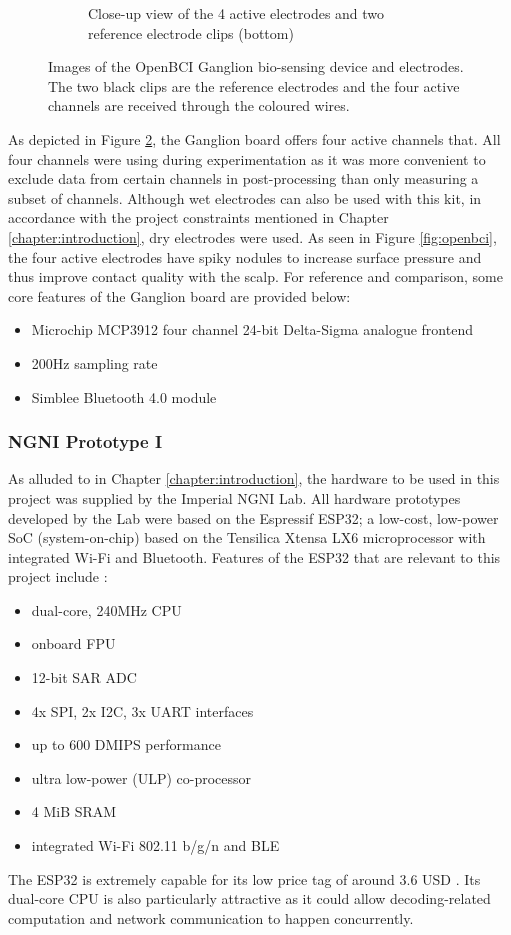 \begin{figure}
\begin{subfigure}[c]{0.45\textwidth}
         \caption{Close-up view of the 4 active electrodes and two reference electrode clips (bottom)}
         \label{fig:openbci-electrodes}
     \end{subfigure}
        \caption[Images of the OpenBCI Ganglion bio-sensing device and electrodes]{Images of the OpenBCI Ganglion bio-sensing device and electrodes. The two black clips are the reference electrodes and the four active channels are received through the coloured wires.}
        \label{fig:openbci-subfigs}
\end{figure}
As depicted in Figure \ref{fig:openbci-subfigs}, the Ganglion board offers four active channels that. All four channels were using during experimentation as it was more convenient to exclude data from certain channels in post-processing than only measuring a subset of channels. Although wet electrodes can also be used with this kit, in accordance with the project constraints mentioned in Chapter \ref{chapter:introduction}, dry electrodes were used. As seen in Figure \ref{fig:openbci}, the four active electrodes have spiky nodules to increase surface pressure and thus improve contact quality with the scalp. For reference and comparison, some core features of the Ganglion board are provided below:
\begin{itemize}
    \item Microchip MCP3912 four channel 24-bit Delta-Sigma analogue frontend
    \item 200Hz sampling rate
    \item Simblee Bluetooth 4.0 module
\end{itemize}

\subsubsection{NGNI Prototype I}

As alluded to in Chapter \ref{chapter:introduction}, the hardware to be used in this project was supplied by the Imperial NGNI Lab. All hardware prototypes developed by the Lab were based on the Espressif ESP32; a low-cost, low-power SoC (system-on-chip) based on the Tensilica Xtensa LX6 microprocessor with integrated Wi-Fi and Bluetooth. Features of the ESP32 that are relevant to this project include \cite{esp32-digikey}:
\begin{itemize}
    \item dual-core, 240MHz CPU
    \item onboard FPU
    \item 12-bit SAR ADC
    \item 4x SPI, 2x I2C, 3x UART interfaces
    \item up to 600 DMIPS performance
    \item ultra low-power (ULP) co-processor
    \item 4 MiB SRAM
    \item integrated Wi-Fi 802.11 b/g/n and BLE
\end{itemize}
The ESP32 is extremely capable for its low price tag of around 3.6 USD \cite{esp32-digikey}. Its dual-core CPU is also particularly attractive as it could allow decoding-related computation and network communication to happen concurrently.

